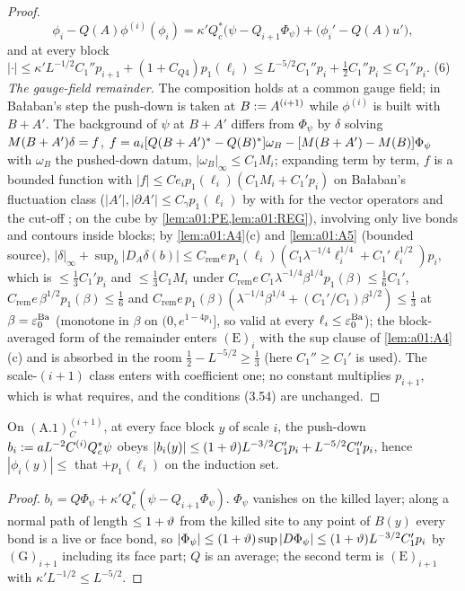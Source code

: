 \begin{proof}
\[
\phi_i-Q(A)\phi^{(i)}(\phi_i)=\kappa'Q_c^*\big(\psi-Q_{i+1}\Phi_\psi\big)+\big(\phi_i'-Q(A)u'\big),
\]
and at every block $|\cdot|\le\kappa'L^{-1/2}C_1''p_{i+1}+(1+C_{Q4})p_1(\ell_i)\le L^{-5/2}C_1''p_i+\frac12C_1''p_i\le C_1''p_i$. (6) \emph{The gauge-field remainder.} The composition holds at a common gauge field; in Ba{\l}aban's step the push-down is taken at $B:= A^{(i+1)}$ while $\phi^{(i)}$ is built with $B+A'$. The background of $\psi$ at $B+A'$ differs from $\Phi_\psi$ by $\delta$ solving $M(B+A')\delta=f$, $f=a_i[Q(B+A')^*-Q(B)^*]\omega_B-[M(B+A')-M(B)]\Phi_\psi$ with $\omega_B$ the pushed-down datum, $|\omega_B|_\infty\le C_1M_i$; expanding term by term, $f$ is a bounded function with $|f|\le Ce_ip_1(\ell_i)(C_1M_i+C_1'p_i)$ on Ba{\l}aban's fluctuation class ($|A'|,|\partial A'|\le C_\gamma p_1(\ell_i)$ by \cite[(2.18)]{K1} with \cite[Thm.~3.3]{K1} for the vector operators and the cut-off \cite[(3.50)]{Ba1}; on the cube by \cref{lem:a01:PE,lem:a01:REG}), involving only live bonds and contours inside blocks; by \cref{lem:a01:A4}(c) and \cref{lem:a01:A5} (bounded source), $|\delta|_\infty+\sup_b|D_A\delta(b)|\le C_{\mathrm{rem}}e\,p_1(\ell_i)(C_1\lambda^{-1/4}\ell_i^{1/4}+C_1'\ell_i^{1/2})p_i$, which is $\le\frac13C_1'p_i$ and $\le\frac13C_1M_i$ under $C_{\mathrm{rem}}e\,C_1\lambda^{-1/4}\beta^{1/4}p_1(\beta)\le\frac16C_1'$, $C_{\mathrm{rem}}e\,\beta^{1/2}p_1(\beta)\le\frac16$ and $C_{\mathrm{rem}}e\,p_1(\beta)(\lambda^{-1/4}\beta^{1/4}+(C_1'/C_1)\beta^{1/2})\le\frac13$ at $\beta=\varepsilon_0^{\mathrm{Ba}}$ (monotone in $\beta$ on $(0,e^{1-4p_1}]$, so valid at every $\ell_i\le\varepsilon_0^{\mathrm{Ba}}$); the block-averaged form of the remainder enters $(\mathrm E)_i$ with the sup clause of \cref{lem:a01:A4}(c) and is absorbed in the room $\frac12-L^{-5/2}\ge\frac13$ (here $C_1''\ge C_1'$ is used). The scale-$(i+1)$ class enters with coefficient one; no constant multiplies $p_{i+1}$, which is what \cite[(3.53)--(3.54)]{Ba1} requires, and the conditions (3.54) are unchanged.
\end{proof}

\begin{corollary}\label{cor:a01:BR}
On $(\mathrm{A.1})^{(i+1)}_C$, at every face block $y$ of scale $i$, the push-down $b_i:= aL^{-2}C^{(i)}Q_c^*\psi$ obeys $|b_i(y)|\le(1+\vartheta)L^{-3/2}C_1'p_i+L^{-5/2}C_1''p_i$, hence $|\phi_i(y)|\le$ that $+p_1(\ell_i)$ on the induction set.
\end{corollary}
\begin{proof}
$b_i=Q\Phi_\psi+\kappa'Q_c^*(\psi-Q_{i+1}\Phi_\psi)$. $\Phi_\psi$ vanishes on the killed layer; along a normal path of length $\le1+\vartheta$ from the killed site to any point of $B(y)$ every bond is a live or face bond, so $|\Phi_\psi|\le(1+\vartheta)\sup|D\Phi_\psi|\le(1+\vartheta)L^{-3/2}C_1'p_i$ by $(\mathrm G)_{i+1}$ including its face part; $Q$ is an average; the second term is $(\mathrm E)_{i+1}$ with $\kappa'L^{-1/2}\le L^{-5/2}$.
\end{proof}

